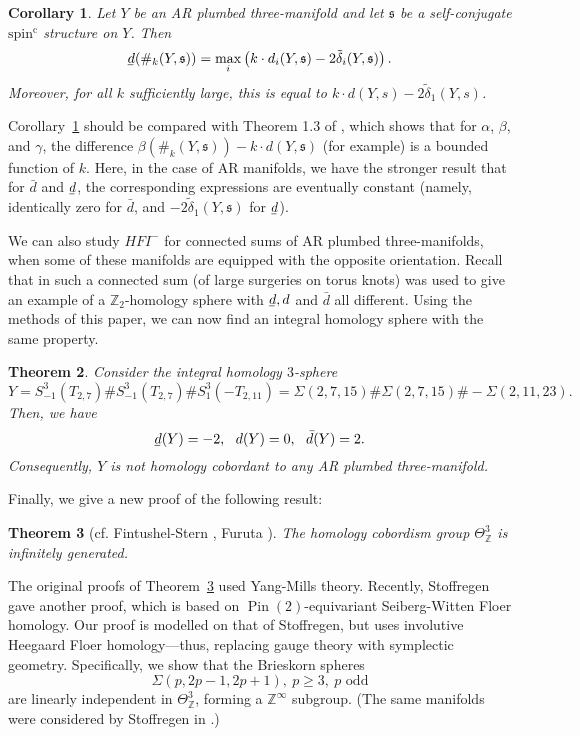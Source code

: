 \documentclass[11 pt]{amsart}
\newtheorem {theorem}{Theorem}[section]
\newtheorem {corollary}[theorem]{Corollary}
\theoremstyle{remark}
\newcommand\Z{\mathbb{Z}}
\def\spinc {{\operatorname{spin^c}}}
\def\s{\mathfrak s}
\def\pin{\operatorname{Pin}(2)}
\newcommand{\bunderline}[1]{\underline{#1\mkern-2mu}\mkern2mu }
\def\du {\bar{d}}
\def\dl {\bunderline{d}}
\def\HFI {\mathit{HFI}}
\newcommand \HFIm {\HFI^-}
\def\tdelta{\tilde\delta}
\begin{document}
\begin{corollary}
\label{cor:stab}
Let $Y$ be an AR plumbed three-manifold and let $\s$ be a self-conjugate $\spinc$ structure on $Y$. Then
\[
\dl(\#_k(Y, \s)) = \max_i \left( k \cdot d_i(Y, \s) - 2\tdelta_i(Y, \s) \right).
\]
Moreover, for all $k$ sufficiently large, this is equal to $k \cdot d(Y, s) - 2\tdelta_1(Y, s)$.
\end{corollary}

Corollary~\ref{cor:stab} should be compared with Theorem 1.3 of \cite{Stoffregen2}, which shows that for $\alpha$, $\beta$, and $\gamma$, the difference $\beta(\#_k(Y, \s)) - k\cdot d(Y, \s)$ (for example) is a bounded function of $k$. Here, in the case of AR manifolds, we have the stronger result that for $\du$ and $\dl$, the corresponding expressions are eventually constant (namely, identically zero for $\du$, and  $-2\tdelta_1(Y, \s)$ for $\dl$).

We can also study $\HFIm$ for connected sums of AR plumbed three-manifolds, when some of these manifolds are equipped with the opposite orientation. Recall that in \cite{HMZ} such a connected sum (of large surgeries on torus knots) was used to give an example of a $\Z_2$-homology sphere with $\dl, d$ and $\du$ all different. Using the methods of this paper, we can now find an integral homology sphere with the same property.

\begin{theorem}
\label{thm:AllDifferent}
Consider the integral homology $3$-sphere
$$ Y = S^3_{-1}(T_{2,7}) \# S^3_{-1}(T_{2,7}) \# S^3_{1}(-T_{2,11})
= \Sigma(2,7,15) \# \Sigma(2,7,15) \# -\Sigma(2,11,23).$$
Then, we have
$$ \dl(Y) = -2, \ \ d(Y) = 0,\ \ \du(Y)=2.$$
Consequently, $Y$ is not homology cobordant to any AR plumbed three-manifold.
\end{theorem}

Finally, we give a new proof of the following result:
\begin{theorem}[cf. Fintushel-Stern \cite{FSinstanton}, Furuta \cite{FurutaHom}]
\label{thm:infgen}
The homology cobordism group $\Theta^3_{\Z}$ is infinitely generated.
\end{theorem}

The original proofs of Theorem~\ref{thm:infgen} used Yang-Mills theory. Recently, Stoffregen \cite{Stoffregen2} gave another proof, which is based on $\pin$-equivariant Seiberg-Witten Floer homology. Our proof is modelled on that of Stoffregen, but uses involutive Heegaard Floer homology---thus, replacing gauge theory with symplectic geometry. Specifically, we show that the Brieskorn spheres
$$  \Sigma(p, 2p-1, 2p+1),\ p\geq 3, \ p \text{ odd}$$
are linearly independent in $\Theta^3_{\Z}$, forming a $\Z^{\infty}$ subgroup. (The same manifolds were considered by Stoffregen in \cite{Stoffregen2}.)
\end{document}

